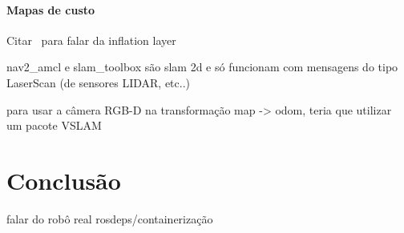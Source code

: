 \documentclass[repeatfields,xlists,xpacks,oneside,yearsonly]{ufrgscca}
\begin{document}
\subsubsection{Mapas de custo}

Citar~\cite{ros_tuning_guide} para falar da inflation layer

nav2\_amcl e slam\_toolbox são slam 2d e só funcionam com mensagens do tipo LaserScan
(de sensores LIDAR, etc..)

para usar a câmera RGB-D na transformação map -> odom, teria que utilizar um pacote VSLAM


\chapter{Conclusão}
\label{conclusao}

falar do robô real
rosdeps/containerização


\printbibliography

%
%
%
\end{document}
